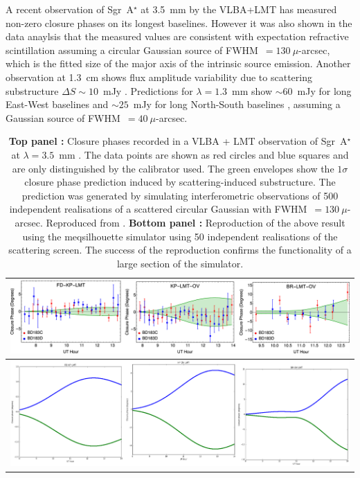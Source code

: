 A recent observation of Sgr~A$^\star$ at 3.5~mm by the VLBA+LMT \citep[see Fig.~\ref{fig:substructure2}][]{Ortiz_2016} has measured non-zero closure phases on its longest baselines. However it was also shown in the data anaylsis that the measured values are consistent with expectation refractive scintillation assuming a circular Gaussian source of FWHM~$=130\ \mu$-arcsec, which is the fitted size of the major axis of the intrinsic source emission. Another observation at 1.3~cm shows flux amplitude variability due to scattering substructure $\Delta S \sim 10$~mJy \citep{Gwinn_2014}. Predictions for $\lambda = 1.3$~mm show $\sim 60$~mJy for long East-West baselines and $\sim 25$~mJy for long North-South baselines \citep*{Johnson_2015a}, assuming a Gaussian source of FWHM~$=40\ \mu$-arcsec.


\begin{table}[h!]
\begin{tabular}{c}
\includegraphics[width=\columnwidth]{Images/ism_cp}\\
\hline
\includegraphics[width=\columnwidth]{Images/ortizrepeat}\\
\end{tabular}
\caption{{\bf Top panel :} Closure phases recorded in a VLBA + LMT observation of  Sgr~A$^\star$ at $\lambda = 3.5$~mm \protect\cite{Ortiz_2016}. The data points are shown as red circles and blue squares and are only distinguished by the calibrator used. The green envelopes show the $1\sigma$ closure phase prediction induced by scattering-induced substructure. The prediction was generated by simulating interferometric observations of 500 independent realisations of a scattered circular Gaussian with FWHM~$=130\ \mu$-arcsec. Reproduced from \protect\citet{Ortiz_2016}. {\bf Bottom panel :} Reproduction of the above result using the {\sc meqsilhouette} simulator using 50 independent realisations of the scattering screen. The success of the reproduction confirms the functionality of a large section of the simulator.\label{fig:substructure2}
}

\end{table}


